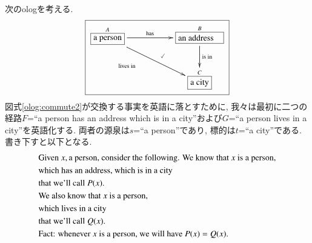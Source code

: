 \begin{example}\label{ex:English fact}


次のologを考える. 
\begin{align}\label{olog:commute2}\fbox{\xymatrixnocompile{\smbox{A}{a person}\LA{rr}{has}\LAL{drr}{\parbox{.8in}{lives in}}&&\obox{B}{.7in}{\rr an address}\ar@{}[dll]|(.4){\checkmark}\LA{d}{is in}\\&&\smbox{C}{a city}}}
\end{align}
図式\ref{olog:commute2}が交換する事実を英語に落とすために, 我々は最初に二つの経路$F$=``a person has an address which is in a city''および$G$=``a person lives in a city''を英語化する. 両者の源泉は$s$=``a person''であり, 標的は$t$=``a city''である. 書き下すと以下となる.
\begin{align*}
&\tn{Given }x,\tn{a person, consider the following. We know that } x\tn{ is a person,}\\
&\tn{which has an address, which is in a city}\\
&\tn{that we'll call } P(x).\\
&\tn{We also know that }x\tn{ is a person,}\\
&\tn{which lives in a city}\\
&\tn{that we'll call } Q(x).\\
&\tn{Fact: whenever }x\tn{ is a person, we will have }P(x)=Q(x).
\end{align*}

\end{example}

